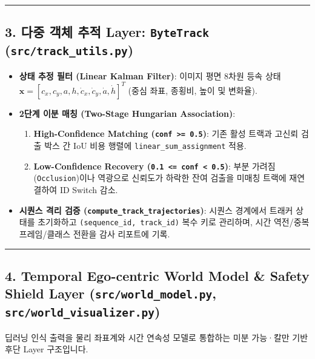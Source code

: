 \documentclass[10.5pt,a4paper]{article}
\begin{document}
\par\noindent\rule{\textwidth}{0.4pt}\par\medskip

\subsection{3. 다중 객체 추적 Layer: \texttt{ByteTrack} (\texttt{src/\allowbreak{}track\_\allowbreak{}utils.\allowbreak{}py})}

\begin{itemize}[leftmargin=1.5em,itemsep=2pt]
\item \textbf{상태 추정 필터 (Linear Kalman Filter)}: 이미지 평면 8차원 등속 상태 $\mathbf{x} = [c_x, c_y, a, h, \dot{c}_x, \dot{c}_y, \dot{a}, \dot{h}]^T$ (중심 좌표, 종횡비, 높이 및 변화율).
\item \textbf{2단계 이분 매칭 (Two-Stage Hungarian Association)}:
\begin{enumerate}[leftmargin=1.8em,itemsep=2pt]
\item \textbf{High-Confidence Matching (\texttt{conf >= 0.\allowbreak{}5})}: 기존 활성 트랙과 고신뢰 검출 박스 간 IoU 비용 행렬에 \texttt{linear\_\allowbreak{}sum\_\allowbreak{}assignment} 적용.
\item \textbf{Low-Confidence Recovery (\texttt{0.\allowbreak{}1 <= conf < 0.\allowbreak{}5})}: 부분 가려짐(\texttt{Occlusion})이나 역광으로 신뢰도가 하락한 잔여 검출을 미매칭 트랙에 재연결하여 ID Switch 감소.
\end{enumerate}
\item \textbf{시퀀스 격리 검증 (\texttt{compute\_\allowbreak{}track\_\allowbreak{}trajectories})}: 시퀀스 경계에서 트래커 상태를 초기화하고 \texttt{(sequence\_\allowbreak{}id,\allowbreak{} track\_\allowbreak{}id)} 복수 키로 관리하며, 시간 역전/중복 프레임/클래스 전환을 감사 리포트에 기록.
\end{itemize}

\par\noindent\rule{\textwidth}{0.4pt}\par\medskip

\subsection{4. Temporal Ego-centric World Model \& Safety Shield Layer (\texttt{src/\allowbreak{}world\_\allowbreak{}model.\allowbreak{}py}, \texttt{src/\allowbreak{}world\_\allowbreak{}visualizer.\allowbreak{}py})}

딥러닝 인식 출력을 물리 좌표계와 시간 연속성 모델로 통합하는 미분 가능·칼만 기반 후단 Layer 구조입니다.
\end{document}
